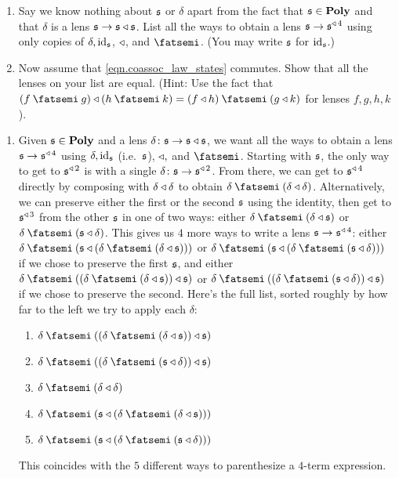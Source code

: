 \documentclass[Book-Poly]{subfiles}
\begin{document}
\begin{exercise}
\begin{enumerate}
    \item Say we know nothing about $\mathfrak{s}$ or $\delta$ apart from the fact that $\mathfrak{s}\in\mathbf{Poly}$ and that $\delta$ is a lens $\mathfrak{s}\to\mathfrak{s}\mathbin{\triangleleft}\mathfrak{s}$.
    List all the ways to obtain a lens $\mathfrak{s}\to\mathfrak{s}^{\mathbin{\triangleleft}\,4}$ using only copies of $\delta,\mathrm{id}_{\mathfrak{s}}$, $\mathbin{\triangleleft}$, and $\then$.
    (You may write $\mathfrak{s}$ for $\mathrm{id}_{\mathfrak{s}}$.)

    \item Now assume that \eqref{eqn.coassoc_law_states} commutes.
    Show that all the lenses on your list are equal.
    (Hint: Use the fact that $(f\then g)\tri(h\then k)=(f\tri h)\then(g\tri k)$ for lenses $f,g,h,k$).
    \qedhere
\end{enumerate}
\begin{solution}
\begin{enumerate}
    \item Given $\mathfrak{s}\in\mathbf{Poly}$ and a lens $\delta\colon\mathfrak{s}\to\mathfrak{s}\mathbin{\triangleleft}\mathfrak{s}$, we want all the ways to obtain a lens $\mathfrak{s}\to\mathfrak{s}^{\mathbin{\triangleleft}\,4}$ using $\delta,\mathrm{id}_{\mathfrak{s}}$ (i.e.\ $\mathfrak{s}$), $\mathbin{\triangleleft},$ and $\then$.
    Starting with $\mathfrak{s}$, the only way to get to $\mathfrak{s}^{\mathbin{\triangleleft}\,2}$ is with a single $\delta\colon\mathfrak{s}\to\mathfrak{s}^{\mathbin{\triangleleft}\,2}$.
    From there, we can get to $\mathfrak{s}^{\mathbin{\triangleleft}\,4}$ directly by composing with $\delta\mathbin{\triangleleft}\delta$ to obtain $\delta\then(\delta\tri\delta)$.
    Alternatively, we can preserve either the first or the second $\mathfrak{s}$ using the identity, then get to $\mathfrak{s}^{\mathbin{\triangleleft}\,3}$ from the other $\mathfrak{s}$ in one of two ways: either $\delta\then(\delta\tri\car{s})$ or $\delta\then(\car{s}\tri\delta)$.
    This gives us $4$ more ways to write a lens $\mathfrak{s}\to\mathfrak{s}^{\mathbin{\triangleleft}\,4}$: either $\delta\then(\car{s}\tri(\delta\then(\delta\tri\car{s})))$ or $\delta\then(\car{s}\tri(\delta\then(\car{s}\tri\delta)))$ if we chose to preserve the first $\mathfrak{s}$, and either $\delta\then((\delta\then(\delta\tri\car{s}))\tri\car{s})$ or $\delta\then((\delta\then(\car{s}\tri\delta))\tri\car{s})$ if we chose to preserve the second.
    Here's the full list, sorted roughly by how far to the left we try to apply each $\delta$:
    \begin{enumerate}[label=(\arabic*)]
        \item $\delta\then((\delta\then(\delta\tri\car{s}))\tri\car{s})$
        \item $\delta\then((\delta\then(\car{s}\tri\delta))\tri\car{s})$
        \item $\delta\then(\delta\tri\delta)$
        \item $\delta\then(\car{s}\tri(\delta\then(\delta\tri\car{s})))$
        \item $\delta\then(\car{s}\tri(\delta\then(\car{s}\tri\delta)))$
    \end{enumerate}
    This coincides with the $5$ different ways to parenthesize a $4$-term expression.


\end{enumerate}
\end{solution}
\end{exercise}
\end{document}
